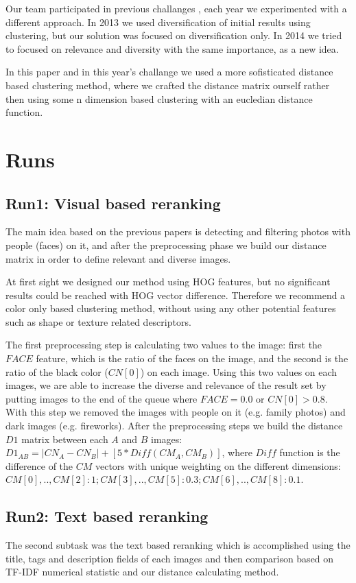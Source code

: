 \documentclass{sig-alternate}
\begin{document}
Our team participated in previous challanges \cite{szHucs2013bmemtm,Paroczi2014}, each year we experimented with a different approach. In 2013 we used diversification of initial results using clustering, but our solution was focused on diversification only. In 2014 we tried to focused on relevance and diversity with the same importance, as a new idea.

In this paper and in this year's challange we used a more sofisticated distance based clustering method, where we crafted the distance matrix ourself rather then using some n dimension based clustering with an eucledian distance function.

\section{Runs}

\subsection{Run1: Visual based reranking}
The main idea based on the previous papers \cite{szHucs2013bmemtm,Paroczi2014} is detecting and filtering photos with people (faces) on it, and after the preprocessing phase we build our distance matrix in order to define relevant and diverse images. 

At first sight we designed our method using HOG features, but no significant results could be reached with HOG vector difference. Therefore we recommend a color only based clustering method, without using any other potential features such as shape or texture related descriptors.

The first preprocessing step is calculating two values to the image: first the $FACE$ feature, which is the ratio of the faces on the image, and the second is the ratio of the black color ($CN[0]$) on each image. Using this two values on each images, we are able to increase the diverse and relevance of the result set by putting images to the end of the queue where $FACE=0.0$ or $CN[0]>0.8$. With this step we removed the images with people on it (e.g. family photos) and dark images (e.g. fireworks).
After the preprocessing steps we build the distance $D1$ matrix between each $A$ and $B$ images: $D1_{AB}=|CN_{A}-CN_{B}|+[5*Diff(CM_{A},CM_{B})]$, where $Diff$ function is the difference of the $CM$ vectors with unique weighting on the different dimensions: $CM[0], .. ,CM[2]: 1; CM[3], .. ,CM[5]: 0.3; CM[6], .. ,CM[8]: 0.1$.

\subsection{Run2: Text based reranking}
The second subtask was the text based reranking which is accomplished using the title, tags and description fields of each images and then comparison based on TF-IDF numerical statistic and our distance calculating method.
\end{document}
